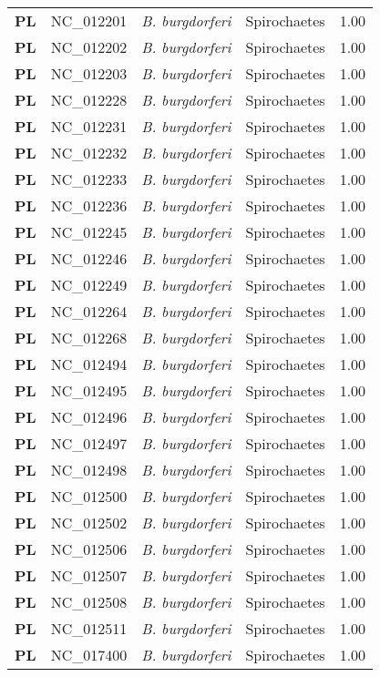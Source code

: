 \begin{adjustwidth}{-3cm}{2cm}
{\begin{supertabular}{>{\bfseries}l|p{0.1\textwidth}p{0.14\textwidth}l|l}
PL & NC\_012201 & \textit{B. burgdorferi} &  Spirochaetes & 1.00\\
PL & NC\_012202 & \textit{B. burgdorferi} &  Spirochaetes & 1.00\\
PL & NC\_012203 & \textit{B. burgdorferi} &  Spirochaetes & 1.00\\
PL & NC\_012228 & \textit{B. burgdorferi} &  Spirochaetes & 1.00\\
PL & NC\_012231 & \textit{B. burgdorferi} &  Spirochaetes & 1.00\\
PL & NC\_012232 & \textit{B. burgdorferi} &  Spirochaetes & 1.00\\
PL & NC\_012233 & \textit{B. burgdorferi} &  Spirochaetes & 1.00\\
PL & NC\_012236 & \textit{B. burgdorferi} &  Spirochaetes & 1.00\\
PL & NC\_012245 & \textit{B. burgdorferi} &  Spirochaetes & 1.00\\
PL & NC\_012246 & \textit{B. burgdorferi} &  Spirochaetes & 1.00\\
PL & NC\_012249 & \textit{B. burgdorferi} &  Spirochaetes & 1.00\\
PL & NC\_012264 & \textit{B. burgdorferi} &  Spirochaetes & 1.00\\
PL & NC\_012268 & \textit{B. burgdorferi} &  Spirochaetes & 1.00\\
PL & NC\_012494 & \textit{B. burgdorferi} &  Spirochaetes & 1.00\\
PL & NC\_012495 & \textit{B. burgdorferi} &  Spirochaetes & 1.00\\
PL & NC\_012496 & \textit{B. burgdorferi} &  Spirochaetes & 1.00\\
PL & NC\_012497 & \textit{B. burgdorferi} &  Spirochaetes & 1.00\\
PL & NC\_012498 & \textit{B. burgdorferi} &  Spirochaetes & 1.00\\
PL & NC\_012500 & \textit{B. burgdorferi} &  Spirochaetes & 1.00\\
PL & NC\_012502 & \textit{B. burgdorferi} &  Spirochaetes & 1.00\\
PL & NC\_012506 & \textit{B. burgdorferi} &  Spirochaetes & 1.00\\
PL & NC\_012507 & \textit{B. burgdorferi} &  Spirochaetes & 1.00\\
PL & NC\_012508 & \textit{B. burgdorferi} &  Spirochaetes & 1.00\\
PL & NC\_012511 & \textit{B. burgdorferi} &  Spirochaetes & 1.00\\
PL & NC\_017400 & \textit{B. burgdorferi} &  Spirochaetes & 1.00\\

\end{supertabular}}
\end{adjustwidth}
